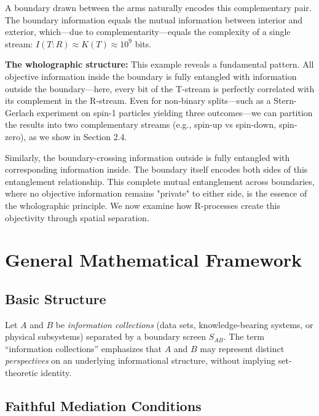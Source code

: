 ﻿\documentclass[12pt]{article}
\begin{document}
A boundary drawn between the arms naturally encodes this complementary pair. 
The boundary information equals the mutual information between interior and 
exterior, which—due to complementarity—equals the complexity of a single stream: 
$I(T:R) \approx K(T) \approx 10^9$ bits.


\textbf{The wholographic structure:} This example reveals a fundamental pattern. 
All objective information inside the boundary is fully entangled with information 
outside the boundary—here, every bit of the T-stream is perfectly correlated 
with its complement in the R-stream.  Even for non-binary splits—such as a Stern-Gerlach experiment on spin-1 particles yielding three outcomes—we can partition the results into two complementary streams (e.g., {spin-up} vs {spin-down, spin-zero}), as we show in Section 2.4.

Similarly, the boundary-crossing information outside is fully entangled with corresponding information inside. The boundary itself encodes both sides of this entanglement relationship. This complete mutual entanglement across boundaries, where no objective information remains "private" to either side, is the essence of the wholographic principle. We now examine how R-processes create this objectivity through spatial separation.
\section{General Mathematical Framework}


\subsection{Basic Structure}


Let $A$ and $B$ be \emph{information collections} (data sets, knowledge-bearing systems, or physical subsystems) separated by a boundary screen $S_{AB}$. The term ``information collections'' emphasizes that $A$ and $B$ may represent distinct \emph{perspectives} on an underlying informational structure, without implying set-theoretic identity.


\subsection{Faithful Mediation Conditions}
\end{document}
